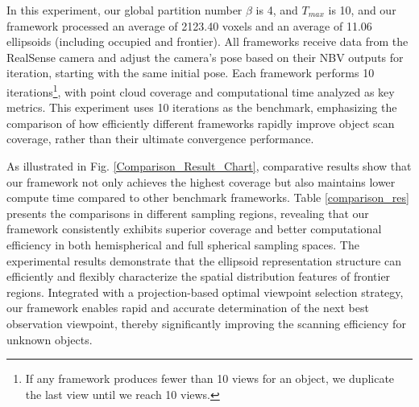 In this experiment, our global partition number $\beta$ is 4, and $ T_{max}$ is 10, and our framework processed an average of 2123.40 voxels and an average of 11.06 ellipsoids (including occupied and frontier).
All frameworks receive data from the RealSense camera and adjust the camera's pose based on their NBV outputs for iteration, starting with the same initial pose. Each framework performs 10 iterations\footnote{If any framework produces fewer than 10 views for an object, we duplicate the last view until we reach 10 views.}, with point cloud coverage and computational time analyzed as key metrics. 
This experiment uses 10 iterations as the benchmark, emphasizing the comparison of how efficiently different frameworks rapidly improve object scan coverage, rather than their ultimate convergence performance.

As illustrated in Fig. \ref{Comparison_Result_Chart}, comparative results show that our framework not only achieves the highest coverage but also maintains lower compute time compared to other benchmark frameworks. Table \ref{comparison_res} presents the comparisons in different sampling regions, revealing that our framework consistently exhibits superior coverage and better computational efficiency in both hemispherical and full spherical sampling spaces. 
The experimental results demonstrate that the ellipsoid representation structure can efficiently and flexibly characterize the spatial distribution features of frontier regions. Integrated with a projection-based optimal viewpoint selection strategy, our framework enables rapid and accurate determination of the next best observation viewpoint, thereby significantly improving the scanning efficiency for unknown objects.

